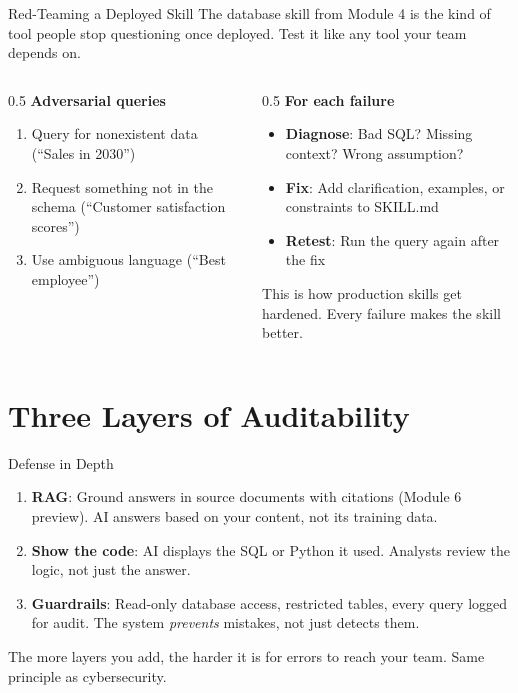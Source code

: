 \documentclass[aspectratio=169]{beamer}
\begin{document}
\begin{frame}{Red-Teaming a Deployed Skill}
The database skill from Module 4 is the kind of tool people \alert{stop questioning} once deployed. Test it like any tool your team depends on.
\vspace{0.3cm}
\begin{columns}[T]
\begin{column}{0.5\textwidth}
\textbf{Adversarial queries}
\begin{enumerate}\small
  \item Query for nonexistent data (``Sales in 2030'')
  \item Request something not in the schema (``Customer satisfaction scores'')
  \item Use ambiguous language (``Best employee'')
\end{enumerate}
\end{column}
\begin{column}{0.5\textwidth}
\textbf{For each failure}
\begin{itemize}\small
  \item \textbf{Diagnose}: Bad SQL? Missing context? Wrong assumption?
  \item \textbf{Fix}: Add clarification, examples, or constraints to SKILL.md
  \item \textbf{Retest}: Run the query again after the fix
\end{itemize}
\vspace{0.3cm}
This is how production skills get hardened. \alert{Every failure makes the skill better.}
\end{column}
\end{columns}
\end{frame}

\section{Three Layers of Auditability}

\begin{frame}{Defense in Depth}
\begin{enumerate}
  \item \textbf{RAG}: Ground answers in source documents with citations (Module 6 preview). AI answers based on \alert{your content}, not its training data.
  \item \textbf{Show the code}: AI displays the SQL or Python it used. Analysts review the logic, not just the answer.
  \item \textbf{Guardrails}: Read-only database access, restricted tables, every query logged for audit. The system \textit{prevents} mistakes, not just detects them.
\end{enumerate}
\vspace{0.5cm}
The more layers you add, the harder it is for errors to reach your team. \alert{Same principle as cybersecurity.}
\end{frame}
\end{document}
